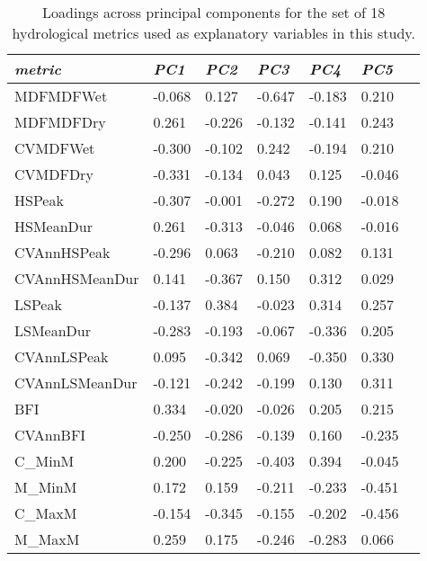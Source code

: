 \documentclass[openright,12pt,a4paper]{memoir}
\begin{document}
\begin{table}[ht]
\tiny
\centering
\caption[Loadings across principal components for hydrological metrics.]{Loadings across principal components for the set of 18 hydrological metrics used as explanatory variables in this study.}
\label{Ch4sup_T2}
\begin{tabu} to 
\hline
\textit{metric}         & \textit{PC1}    & \textit{PC2}    & \textit{PC3}    & \textit{PC4}    & \textit{PC5}    \\ \hline
MDFMDFWet      & -0.068 & 0.127  & -0.647 & -0.183 & 0.210  \\
MDFMDFDry      & 0.261  & -0.226 & -0.132 & -0.141 & 0.243  \\
CVMDFWet       & -0.300 & -0.102 & 0.242  & -0.194 & 0.210  \\
CVMDFDry       & -0.331 & -0.134 & 0.043  & 0.125  & -0.046 \\
HSPeak         & -0.307 & -0.001 & -0.272 & 0.190  & -0.018 \\
HSMeanDur      & 0.261  & -0.313 & -0.046 & 0.068  & -0.016 \\
CVAnnHSPeak    & -0.296 & 0.063  & -0.210 & 0.082  & 0.131  \\
CVAnnHSMeanDur & 0.141  & -0.367 & 0.150  & 0.312  & 0.029  \\
LSPeak         & -0.137 & 0.384  & -0.023 & 0.314  & 0.257  \\
LSMeanDur      & -0.283 & -0.193 & -0.067 & -0.336 & 0.205  \\
CVAnnLSPeak    & 0.095  & -0.342 & 0.069  & -0.350 & 0.330  \\
CVAnnLSMeanDur & -0.121 & -0.242 & -0.199 & 0.130  & 0.311  \\
BFI            & 0.334  & -0.020 & -0.026 & 0.205  & 0.215  \\
CVAnnBFI       & -0.250 & -0.286 & -0.139 & 0.160  & -0.235 \\
C\_MinM        & 0.200  & -0.225 & -0.403 & 0.394  & -0.045 \\
M\_MinM        & 0.172  & 0.159  & -0.211 & -0.233 & -0.451 \\
C\_MaxM        & -0.154 & -0.345 & -0.155 & -0.202 & -0.456 \\
M\_MaxM        & 0.259  & 0.175  & -0.246 & -0.283 & 0.066  \\ \hline
\end{tabu}
\end{table}
\end{document}
